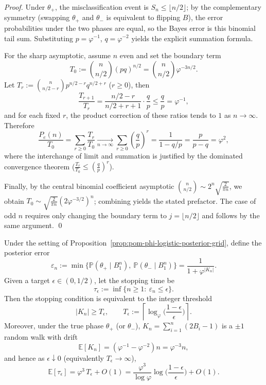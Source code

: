 \begin{proof}
Under \(\theta_+\), the misclassification event is \(S_n\le \lfloor n/2\rfloor\);
by the complementary symmetry (swapping \(\theta_+\) and \(\theta_-\) is equivalent to flipping \(B\)), the error probabilities under the two phases are equal, so the Bayes error is this binomial tail sum.
Substituting \(p=\varphi^{-1}\), \(q=\varphi^{-2}\) yields the explicit summation formula.
\par
For the sharp asymptotic, assume \(n\) even and set the boundary term
\[
T_0:=\binom{n}{n/2}(pq)^{n/2}=\binom{n}{n/2}\varphi^{-3n/2}.
\]
Let \(T_r:=\binom{n}{n/2-r}p^{n/2-r}q^{n/2+r}\) (\(r\ge 0\)), then
\[
\frac{T_{r+1}}{T_r}
=\frac{n/2-r}{n/2+r+1}\cdot\frac{q}{p}
\le \frac{q}{p}=\varphi^{-1},
\]
and for each fixed \(r\), the product correction of these ratios tends to \(1\) as \(n\to\infty\).
Therefore
\[
\frac{P_e(n)}{T_0}
=\sum_{r\ge 0}\frac{T_r}{T_0}
\xrightarrow[n\to\infty]{}
\sum_{r\ge 0}\left(\frac{q}{p}\right)^r
=\frac{1}{1-q/p}
=\frac{p}{p-q}
=\varphi^2,
\]
where the interchange of limit and summation is justified by the dominated convergence theorem (\(\frac{T_r}{T_0}\le (\frac{q}{p})^r\)).
\par
Finally, by the central binomial coefficient asymptotic
\(
\binom{n}{n/2}\sim 2^n\sqrt{\frac{2}{\pi n}}
\),
we obtain
\(
T_0\sim \sqrt{\frac{2}{\pi n}}(2\varphi^{-3/2})^{n}
\);
combining yields the stated prefactor.
The case of odd \(n\) requires only changing the boundary term to \(j=\lfloor n/2\rfloor\) and follows by the same argument. \qed
\end{proof}

\begin{proposition}\label{prop:pom-confidence-hitting-time-phi-threshold}
Under the setting of Proposition~\ref{prop:pom-phi-logistic-posterior-grid}, define the posterior error
\[
\varepsilon_n:=\min\{\mathbb{P}(\theta_+\mid B_1^n),\ \mathbb{P}(\theta_-\mid B_1^n)\}
=\frac{1}{1+\varphi^{|K_n|}}.
\]
Given a target \(\epsilon\in(0,1/2)\), let the stopping time be
\[
\tau_\epsilon:=\inf\{n\ge 1:\ \varepsilon_n\le \epsilon\}.
\]
Then the stopping condition is equivalent to the integer threshold
\[
\boxed{\;
|K_n|\ge T_\epsilon,\qquad
T_\epsilon:=\left\lceil\log_\varphi\!\Big(\frac{1-\epsilon}{\epsilon}\Big)\right\rceil.\;}
\]
Moreover, under the true phase \(\theta_+\) (or \(\theta_-\)), \(K_n=\sum_{i=1}^n(2B_i-1)\) is a \(\pm 1\) random walk with drift
\[
\mathbb{E}[K_n]=(\varphi^{-1}-\varphi^{-2})n=\varphi^{-3}n,
\]
and hence as \(\epsilon\downarrow 0\) (equivalently \(T_\epsilon\to\infty\)),
\[
\boxed{\;
\mathbb{E}[\tau_\epsilon]=\varphi^{3}\,T_\epsilon+O(1)
=\frac{\varphi^{3}}{\log\varphi}\log\!\Big(\frac{1-\epsilon}{\epsilon}\Big)+O(1).\;}
\]
\end{proposition}

